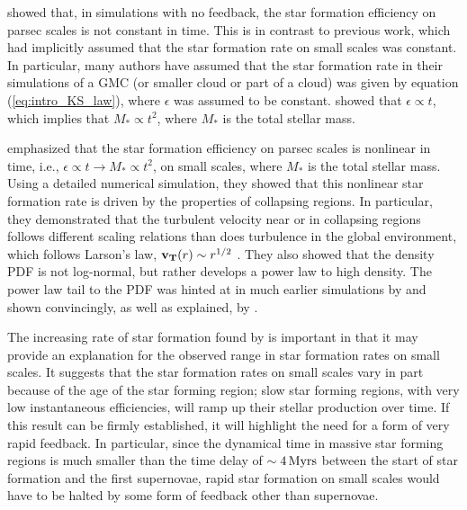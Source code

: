 \documentclass[../dissertation.tex]{subfiles}
\begin{document}
\citet{2015ApJ...800...49L} showed that, in simulations with no feedback, the star formation efficiency on
parsec scales is not constant in time.
This is in contrast to previous work, which had implicitly assumed that the star formation rate on small scales was constant.
In particular, many authors have assumed that the star formation rate in their simulations of a GMC (or smaller cloud or part of a cloud) was given by equation (\ref{eq:intro_KS_law}), where $\epsilon$ was assumed to be constant.
\citet{2015ApJ...800...49L} showed that $\epsilon \propto t$, which implies that $M_* \propto t^2$, where $M_*$ is the total stellar mass.

\citet{2015ApJ...800...49L} emphasized that the star formation efficiency on 
parsec scales is nonlinear 
in time, i.e., $\epsilon \propto t \rightarrow M_* \propto t^2$, on small scales, where $M_*$ is the total stellar mass. 
Using a detailed numerical simulation, they showed that this nonlinear star formation 
rate is driven by the properties of collapsing regions.
In particular, they demonstrated that the turbulent velocity near or in collapsing regions follows 
different scaling relations than does turbulence in the global environment, which follows
Larson's law, $\mathbf{v_T} (r)\sim r^{1/2}$ \citep{1981MNRAS.194..809L}. 
They also showed that the density PDF 
is not log-normal, but rather develops a power law to high density.
The power law tail to the  PDF  was hinted at in much earlier simulations by \citet{2000ApJ...535..869K} and shown convincingly, 
as well as explained, by \citet{2011ApJ...727L..20K}. 

The increasing rate of star formation found by \citet{2015ApJ...800...49L} is important 
in that it may provide an explanation for the observed range in star formation rates on 
small scales.  It suggests that the star formation rates on small scales 
vary in part because of the age of the star forming region; slow star forming 
regions, with very low instantaneous efficiencies, will ramp up their stellar production over time. If this result
can be firmly established, it will highlight the need for a form of very rapid 
feedback. In particular, since the dynamical time in massive star forming regions 
is much smaller than the time delay of $\sim 4{\,\rm Myrs}$ between the start of star 
formation and the first supernovae, rapid star formation on small scales would 
have to be halted by some form of feedback other than supernovae. 
\end{document}
